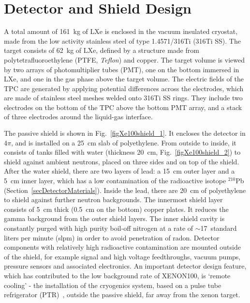 \section{Detector and Shield Design}
\label{secDetectorDesign}

A total amount of 161~kg of LXe is enclosed in the vacuum insulated cryostat, made from the low activity stainless steel of type 1.4571/316Ti (316Ti SS). The target consists of 62~kg of LXe, defined by a structure made from polytetrafluoroethylene (PTFE, {\it Teflon}) and copper.
The target volume is viewed by two arrays of photomultiplier tubes (PMT), one on the bottom immersed in LXe, and one in the gas phase above the target volume.
The electric fields of the TPC are generated by applying potential differences across the electrodes, which are made of stainless steel meshes welded onto 316Ti SS rings. They include two electrodes on the bottom of the TPC above the bottom PMT array, and a stack of three electrodes around the liquid-gas interface.

The passive shield is shown in Fig.~\ref{figXe100shield_1}. It encloses the detector in 4$\pi$, and is installed on a 25~cm slab of polyethylene. From outside to inside, it consists of tanks filled with water (thickness 20~cm, Fig.~\ref{figXe100shield_2}) to shield against ambient neutrons, placed on three sides and on top of the shield. After the water shield, there are two layers of lead: a 15~cm outer layer and a 5~cm inner layer, which has a low contamination of the radioactive isotope ${^{210}}$Pb (Section~\ref{secDetectorMaterials}). Inside the lead, there are 20~cm of polyethylene to shield against further neutron backgrounds. The innermost shield layer consists of 5~cm thick (0.5~cm on the bottom) copper plates. It reduces the gamma background from the outer shield layers. The inner shield cavity is constantly purged with high purity boil-off nitrogen at a rate of $\sim$17~standard liters per minute (slpm) in order to avoid penetration of radon. Detector components with relatively high radioactive contamination are mounted outside of the shield, for example signal and high voltage feedthroughs, vacuum pumps, pressure sensors and associated electronics. An important detector design feature, which has contributed to the low background rate of XENON100, is `remote cooling' - the installation of the cryogenics system, based on a pulse tube refrigerator (PTR)~\cite{PTR}, outside the passive shield, far away from the xenon target.


